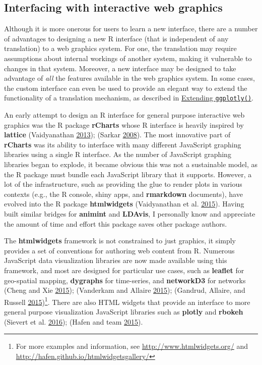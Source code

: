 \documentclass[12pt,]{isuthesis}
\let\rmarkdownfootnote\footnote%
\def\footnote{\protect\rmarkdownfootnote}
\begin{document}
\subsection{Interfacing with interactive web
graphics}\label{interfacing-with-interactive-web-graphics}

Although it is more onerous for users to learn a new interface, there
are a number of advantages to designing a new R interface (that is
independent of any translation) to a web graphics system. For one, the
translation may require assumptions about internal workings of another
system, making it vulnerable to changes in that system. Moreover, a new
interface may be designed to take advantage of \emph{all} the features
available in the web graphics system. In some cases, the custom
interface can even be used to provide an elegant way to extend the
functionality of a translation mechanism, as described in
\protect\hyperlink{extending-ggplotlyux28ux29}{Extending
\texttt{ggplotly()}}.

An early attempt to design an R interface for general purpose
interactive web graphics was the R package \textbf{rCharts} whose R
interface is heavily inspired by \textbf{lattice} (Vaidyanathan
\protect\hyperlink{ref-rCharts}{2013}); (Sarkar
\protect\hyperlink{ref-lattice}{2008}). The most innovative part of
\textbf{rCharts} was its ability to interface with many different
JavaScript graphing libraries using a single R interface. As the number
of JavaScript graphing libraries began to explode, it became obvious
this was not a sustainable model, as the R package must bundle each
JavaScript library that it supports. However, a lot of the
infrastructure, such as providing the glue to render plots in various
contexts (e.g., the R console, shiny apps, and \textbf{rmarkdown}
documents), have evolved into the R package \textbf{htmlwidgets}
(Vaidyanathan et al. \protect\hyperlink{ref-htmlwidgets}{2015}). Having
built similar bridges for \textbf{animint} and \textbf{LDAvis}, I
personally know and appreciate the amount of time and effort this
package saves other package authors.

The \textbf{htmlwidgets} framework is not constrained to just graphics,
it simply provides a set of conventions for authoring web content from
R. Numerous JavaScript data visualization libraries are now made
available using this framework, and most are designed for particular use
cases, such as \textbf{leaflet} for geo-spatial mapping,
\textbf{dygraphs} for time-series, and \textbf{networkD3} for networks
(Cheng and Xie \protect\hyperlink{ref-leaflet}{2015}); (Vanderkam and
Allaire \protect\hyperlink{ref-dygraphs}{2015}); (Gandrud, Allaire, and
Russell \protect\hyperlink{ref-networkD3}{2015})\footnote{For more
  examples and information, see \url{http://www.htmlwidgets.org/} and
  \url{http://hafen.github.io/htmlwidgetsgallery/}}. There are also HTML
widgets that provide an interface to more general purpose visualization
JavaScript libraries such as \textbf{plotly} and \textbf{rbokeh}
(Sievert et al. \protect\hyperlink{ref-plotly}{2016}); (Hafen and team
\protect\hyperlink{ref-rbokeh}{2015}).
\end{document}
